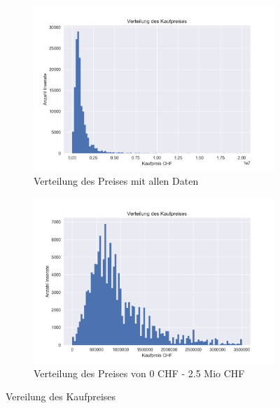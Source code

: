 \begin{figure}[ht]
\begin{subfigure}{.5\textwidth}
  \centering
  \includegraphics[width=\linewidth]{images/bar_des_kauf_preises.png}
  \caption[Verteilung des Preises mit allen Daten]{Verteilung des Preises mit allen Daten\\}
  \label{fig:verteilung_price_all}
\end{subfigure}
\begin{subfigure}{.5\textwidth}
  \centering
  \includegraphics[width=\linewidth]{images/bar_des_kauf_preises_cut.png}
  \caption[Verteilung des Preises von 0 CHF - 2.5 Mio CHF]{Verteilung des Preises von 0 CHF - 2.5 Mio CHF}
  \label{fig:verteilung_price_part}
\end{subfigure}
\caption[Vereilung des Kaufpreises]{Vereilung des Kaufpreises}
\label{fig:price}
\end{figure}

